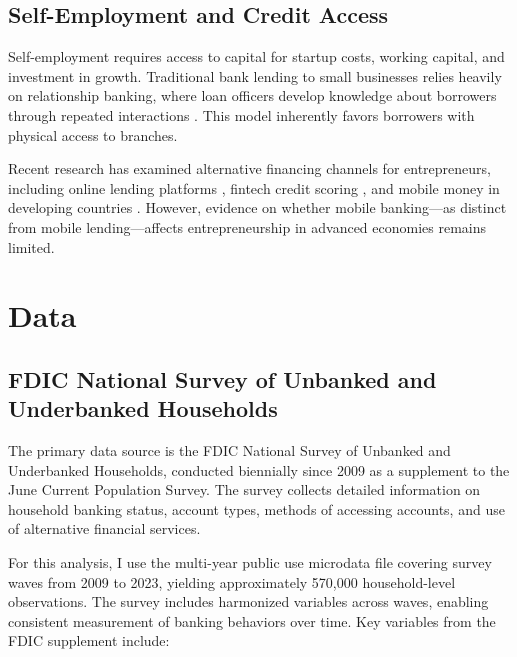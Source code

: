 \documentclass[12pt]{article}
\begin{document}
\subsection{Self-Employment and Credit Access}

Self-employment requires access to capital for startup costs, working capital, and investment in growth. Traditional bank lending to small businesses relies heavily on relationship banking, where loan officers develop knowledge about borrowers through repeated interactions \citep{berger1995}. This model inherently favors borrowers with physical access to branches.

Recent research has examined alternative financing channels for entrepreneurs, including online lending platforms \citep{morse2015, tang2019}, fintech credit scoring \citep{berg2020, fuster2019}, and mobile money in developing countries \citep{beck2018}. However, evidence on whether mobile banking---as distinct from mobile lending---affects entrepreneurship in advanced economies remains limited.

\section{Data}

\subsection{FDIC National Survey of Unbanked and Underbanked Households}

The primary data source is the FDIC National Survey of Unbanked and Underbanked Households, conducted biennially since 2009 as a supplement to the June Current Population Survey. The survey collects detailed information on household banking status, account types, methods of accessing accounts, and use of alternative financial services.

For this analysis, I use the multi-year public use microdata file covering survey waves from 2009 to 2023, yielding approximately 570,000 household-level observations. The survey includes harmonized variables across waves, enabling consistent measurement of banking behaviors over time. Key variables from the FDIC supplement include:
\end{document}
